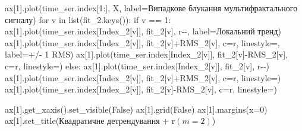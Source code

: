 \documentclass[
  letterpaper,
]{report}
\newenvironment{Shaded}{\begin{snugshade}}{\end{snugshade}}
\newcommand{\BuiltInTok}[1]{\textcolor[rgb]{0.00,0.23,0.31}{#1}}
\newcommand{\ControlFlowTok}[1]{\textcolor[rgb]{0.00,0.23,0.31}{#1}}
\newcommand{\DecValTok}[1]{\textcolor[rgb]{0.68,0.00,0.00}{#1}}
\newcommand{\KeywordTok}[1]{\textcolor[rgb]{0.00,0.23,0.31}{#1}}
\newcommand{\NormalTok}[1]{\textcolor[rgb]{0.00,0.23,0.31}{#1}}
\newcommand{\OperatorTok}[1]{\textcolor[rgb]{0.37,0.37,0.37}{#1}}
\newcommand{\StringTok}[1]{\textcolor[rgb]{0.13,0.47,0.30}{#1}}
\newcommand{\VariableTok}[1]{\textcolor[rgb]{0.07,0.07,0.07}{#1}}
\newcommand{\VerbatimStringTok}[1]{\textcolor[rgb]{0.13,0.47,0.30}{#1}}
\begin{document}
\begin{Shaded}
\begin{Highlighting}[]
\NormalTok{ax[}\DecValTok{1}\NormalTok{].plot(time\_ser.index[}\DecValTok{1}\NormalTok{:], X, label}\OperatorTok{=}\StringTok{\textquotesingle{}Випадкове блукання мультифрактального сигналу\textquotesingle{}}\NormalTok{)}
\ControlFlowTok{for}\NormalTok{ v }\KeywordTok{in} \BuiltInTok{list}\NormalTok{(fit\_2.keys()):}
    \ControlFlowTok{if}\NormalTok{ v }\OperatorTok{==} \DecValTok{1}\NormalTok{:}
\NormalTok{        ax[}\DecValTok{1}\NormalTok{].plot(time\_ser.index[Index\_2[v]], fit\_2[v], }\StringTok{\textquotesingle{}r{-}{-}\textquotesingle{}}\NormalTok{, label}\OperatorTok{=}\StringTok{\textquotesingle{}Локальний тренд\textquotesingle{}}\NormalTok{)}
\NormalTok{        ax[}\DecValTok{1}\NormalTok{].plot(time\_ser.index[Index\_2[v]], fit\_2[v]}\OperatorTok{+}\NormalTok{RMS\_2[v], c}\OperatorTok{=}\StringTok{\textquotesingle{}r\textquotesingle{}}\NormalTok{, linestyle}\OperatorTok{=}\StringTok{\textquotesingle{}{-}\textquotesingle{}}\NormalTok{, label}\OperatorTok{=}\StringTok{\textquotesingle{}+/{-} 1 RMS\textquotesingle{}}\NormalTok{)}
\NormalTok{        ax[}\DecValTok{1}\NormalTok{].plot(time\_ser.index[Index\_2[v]], fit\_2[v]}\OperatorTok{{-}}\NormalTok{RMS\_2[v], c}\OperatorTok{=}\StringTok{\textquotesingle{}r\textquotesingle{}}\NormalTok{, linestyle}\OperatorTok{=}\StringTok{\textquotesingle{}{-}\textquotesingle{}}\NormalTok{)}
    \ControlFlowTok{else}\NormalTok{:}
\NormalTok{        ax[}\DecValTok{1}\NormalTok{].plot(time\_ser.index[Index\_2[v]], fit\_2[v], }\StringTok{\textquotesingle{}r{-}{-}\textquotesingle{}}\NormalTok{)}
\NormalTok{        ax[}\DecValTok{1}\NormalTok{].plot(time\_ser.index[Index\_2[v]], fit\_2[v]}\OperatorTok{+}\NormalTok{RMS\_2[v], c}\OperatorTok{=}\StringTok{\textquotesingle{}r\textquotesingle{}}\NormalTok{, linestyle}\OperatorTok{=}\StringTok{\textquotesingle{}{-}\textquotesingle{}}\NormalTok{)}
\NormalTok{        ax[}\DecValTok{1}\NormalTok{].plot(time\_ser.index[Index\_2[v]], fit\_2[v]}\OperatorTok{{-}}\NormalTok{RMS\_2[v], c}\OperatorTok{=}\StringTok{\textquotesingle{}r\textquotesingle{}}\NormalTok{, linestyle}\OperatorTok{=}\StringTok{\textquotesingle{}{-}\textquotesingle{}}\NormalTok{)}

\NormalTok{ax[}\DecValTok{1}\NormalTok{].get\_xaxis().set\_visible(}\VariableTok{False}\NormalTok{)}
\NormalTok{ax[}\DecValTok{1}\NormalTok{].grid(}\VariableTok{False}\NormalTok{)}
\NormalTok{ax[}\DecValTok{1}\NormalTok{].margins(x}\OperatorTok{=}\DecValTok{0}\NormalTok{)}
\NormalTok{ax[}\DecValTok{1}\NormalTok{].set\_title(}\StringTok{\textquotesingle{}Квадратичне детрендування \textquotesingle{}} \OperatorTok{+} \VerbatimStringTok{r\textquotesingle{}$(m=2)$\textquotesingle{}}\NormalTok{)}


\end{Highlighting}
\end{Shaded}
\end{document}
